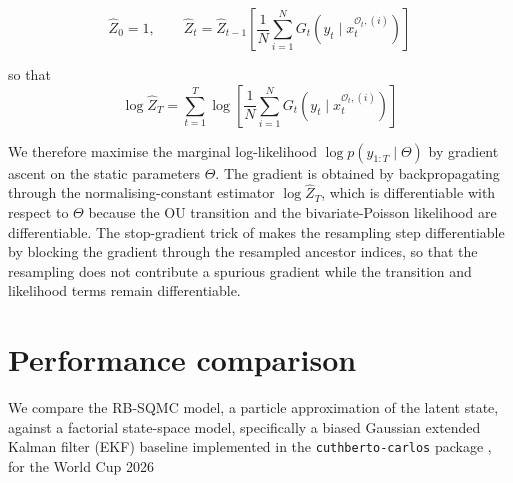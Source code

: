 \begin{equation}
    \widehat Z_0 = 1, \qquad \widehat Z_t = \widehat Z_{t-1} \left[ \frac{1}{N} \sum_{i=1}^N G_t(y_t \mid x_t^{\mathcal{O}_t,(i)}) \right] \nonumber
\end{equation}

so that
\begin{equation}
    \log \widehat Z_T = \sum_{t=1}^T \log \left[ \frac{1}{N} \sum_{i=1}^N G_t(y_t \mid x_t^{\mathcal{O}_t,(i)}) \right] \nonumber
\end{equation}

We therefore maximise the marginal log-likelihood $\log p(y_{1:T} \mid \Theta)$ by gradient ascent on the static parameters $\Theta$. The gradient is obtained by backpropagating through the normalising-constant estimator $\log \widehat Z_T$, which is differentiable with respect to $\Theta$ because the OU transition and the bivariate-Poisson likelihood are differentiable. The stop-gradient trick of \citet{scibior2021differentiableparticlefiltering} makes the resampling step differentiable by blocking the gradient through the resampled ancestor indices, so that the resampling does not contribute a spurious gradient while the transition and likelihood terms remain differentiable.

\section{Performance comparison}
\label{sec:performance-comparison}

We compare the RB-SQMC model, a particle approximation of the latent state, against a factorial state-space model, specifically a biased Gaussian extended Kalman filter (EKF) baseline implemented in the \texttt{cuthberto-carlos} package \citep{cuthbertocarlos2026}, for the World Cup 2026



